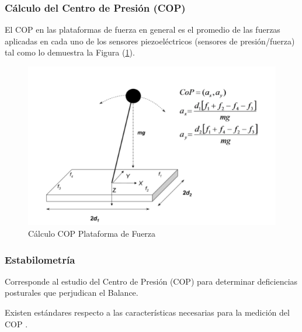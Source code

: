 \documentclass[12pt,a4paper]{article}
\begin{document}
\subsubsection{Cálculo del Centro de Presión (COP)}
El COP en las plataformas de fuerza en general es el promedio de las fuerzas aplicadas en cada uno de los sensores piezoeléctricos (sensores de presión/fuerza) tal como lo demuestra la Figura (\ref{fig:calculoCOP}).

\begin{figure}[H]
	\centering
	\includegraphics[width=0.65\linewidth]{images/calculoCOP}
	\caption{Cálculo COP Plataforma de Fuerza}
	\label{fig:calculoCOP}
\end{figure}

\subsubsection{Estabilometría}
Corresponde al estudio del Centro de Presión (COP) para determinar deficiencias posturales que perjudican el Balance.

Existen estándares respecto a las características necesarias para la medición del COP \cite{scoppa_clinical_2013}.
\end{document}

